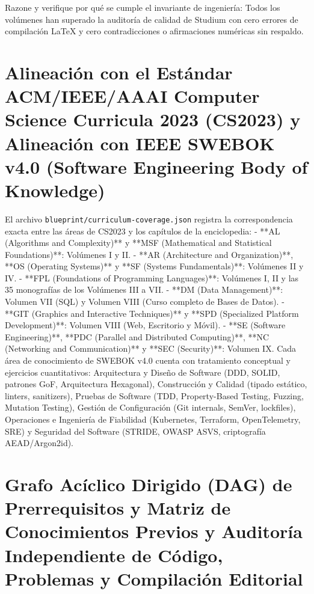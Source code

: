 \documentclass{book}
\begin{document}
\begin{tcolorbox}[title={Autoficha}, studiumcheck, breakable]

Razone y verifique por qué se cumple el invariante de ingeniería: Todos los volúmenes han superado la auditoría de calidad de Studium con cero errores de compilación LaTeX y cero contradicciones o afirmaciones numéricas sin respaldo.
\end{tcolorbox}

\section{Alineación con el Estándar ACM/IEEE/AAAI Computer Science Curricula 2023 (CS2023) y Alineación con IEEE SWEBOK v4.0 (Software Engineering Body of Knowledge)}

El archivo \texttt{blueprint/curriculum-coverage.json} registra la correspondencia exacta entre las áreas de CS2023 y los capítulos de la enciclopedia:
- **AL (Algorithms and Complexity)** y **MSF (Mathematical and Statistical Foundations)**: Volúmenes I y II.
- **AR (Architecture and Organization)**, **OS (Operating Systems)** y **SF (Systems Fundamentals)**: Volúmenes II y IV.
- **FPL (Foundations of Programming Languages)**: Volúmenes I, II y las 35 monografías de los Volúmenes III a VII.
- **DM (Data Management)**: Volumen VII (SQL) y Volumen VIII (Curso completo de Bases de Datos).
- **GIT (Graphics and Interactive Techniques)** y **SPD (Specialized Platform Development)**: Volumen VIII (Web, Escritorio y Móvil).
- **SE (Software Engineering)**, **PDC (Parallel and Distributed Computing)**, **NC (Networking and Communication)** y **SEC (Security)**: Volumen IX.
Cada área de conocimiento de SWEBOK v4.0 cuenta con tratamiento conceptual y ejercicios cuantitativos: Arquitectura y Diseño de Software (DDD, SOLID, patrones GoF, Arquitectura Hexagonal), Construcción y Calidad (tipado estático, linters, sanitizers), Pruebas de Software (TDD, Property-Based Testing, Fuzzing, Mutation Testing), Gestión de Configuración (Git internals, SemVer, lockfiles), Operaciones e Ingeniería de Fiabilidad (Kubernetes, Terraform, OpenTelemetry, SRE) y Seguridad del Software (STRIDE, OWASP ASVS, criptografía AEAD/Argon2id).

\section{Grafo Acíclico Dirigido (DAG) de Prerrequisitos y Matriz de Conocimientos Previos y Auditoría Independiente de Código, Problemas y Compilación Editorial}
\end{document}
